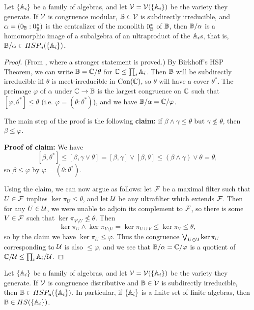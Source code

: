 \begin{appendices}
\begin{thm}\label{jonsson-modular} Let $\{\mathbb{A}_i\}$ be a family of algebras, and let $\mathcal{V} = \mathcal{V}(\{\mathbb{A}_i\})$ be the variety they generate. If $\mathcal{V}$ is congruence modular, $\mathbb{B} \in \mathcal{V}$ is subdirectly irreducible, and $\alpha = (0_{\mathbb{B}} : 0_{\mathbb{B}}^*)$ is the centralizer of the monolith $0_{\mathbb{B}}^*$ of $\mathbb{B}$, then $\mathbb{B}/\alpha$ is a homomorphic image of a subalgebra of an ultraproduct of the $\mathbb{A}_i$s, that is, $\mathbb{B}/\alpha \in HSP_u(\{\mathbb{A}_i\})$.
\end{thm}
\begin{proof} (From \cite{commutator-theory}, where a stronger statement is proved.) By Birkhoff's HSP Theorem, we can write $\mathbb{B} = \mathbb{C}/\theta$ for $\mathbb{C} \le \prod_i \mathbb{A}_i$. Then $\mathbb{B}$ will be subdirectly irreducible iff $\theta$ is meet-irreducible in $\operatorname{Con}(\mathbb{C})$, so $\theta$ will have a cover $\theta^*$. The preimage $\varphi$ of $\alpha$ under $\mathbb{C} \rightarrow \mathbb{B}$ is the largest congruence on $\mathbb{C}$ such that $[\varphi,\theta^*] \le \theta$ (i.e. $\varphi = (\theta:\theta^*)$), and we have $\mathbb{B}/\alpha = \mathbb{C}/\varphi$.

The main step of the proof is the following {\bf claim:} if $\beta \wedge \gamma \le \theta$ but $\gamma \not\le \theta$, then $\beta \le \varphi$.

{\bf Proof of claim:} We have
\[
[\beta,\theta^*] \le [\beta,\gamma\vee\theta] = [\beta,\gamma]\vee [\beta,\theta] \le (\beta \wedge \gamma) \vee \theta = \theta,
\]
so $\beta \le \varphi$ by $\varphi = (\theta:\theta^*)$.

Using the claim, we can now argue as follows: let $\mathcal{F}$ be a maximal filter such that $U \in \mathcal{F}$ implies $\ker \pi_U \le \theta$, and let $\mathcal{U}$ be any ultrafilter which extends $\mathcal{F}$. Then for any $U \in \mathcal{U}$, we were unable to adjoin its complement to $\mathcal{F}$, so there is some $V \in \mathcal{F}$ such that $\ker \pi_{V\setminus U} \not\le \theta$. Then
\[
\ker \pi_U \wedge \ker \pi_{V\setminus U} = \ker \pi_{U\cup V} \le \ker \pi_V \le \theta,
\]
so by the claim we have $\ker \pi_U \le \varphi$. Thus the congruence $\bigvee_{U \in \mathcal{U}} \ker \pi_U$ corresponding to $\mathcal{U}$ is also $\le \varphi$, and we see that $\mathbb{B}/\alpha = \mathbb{C}/\varphi$ is a quotient of $\mathbb{C}/\mathcal{U} \le \prod_i \mathbb{A}_i/\mathcal{U}$.
\end{proof}

\begin{cor} Let $\{\mathbb{A}_i\}$ be a family of algebras, and let $\mathcal{V} = \mathcal{V}(\{\mathbb{A}_i\})$ be the variety they generate. If $\mathcal{V}$ is congruence distributive and $\mathbb{B} \in \mathcal{V}$ is subdirectly irreducible, then $\mathbb{B} \in HSP_u(\{\mathbb{A}_i\})$. In particular, if $\{\mathbb{A}_i\}$ is a finite set of finite algebras, then $\mathbb{B} \in HS(\{\mathbb{A}_i\})$.
\end{cor}


\end{appendices}
